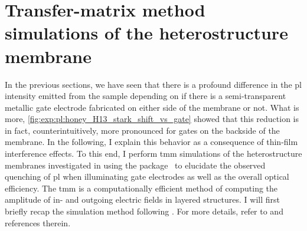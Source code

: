 \section{Transfer-matrix method simulations of the heterostructure membrane}\label{sec:exp:tmm}
In the previous sections, we have seen that there is a profound difference in the \gls{pl} intensity emitted from the sample depending on if there is a semi-transparent metallic gate electrode fabricated on either side of the membrane or not.
What is more, \cref{fig:exp:pl:honey_H13_stark_shift_vs_gate} showed that this reduction is in fact, counterintuitively, more pronounced for gates on the backside of the membrane.
In the following, I explain this behavior as a consequence of thin-film interference effects.
To this end, I perform \gls{tmm} simulations of the heterostructure membranes investigated in \thispart using the \pymoosh package~\cite{Langevin2024} to elucidate the observed quenching of \gls{pl} when illuminating gate electrodes as well as the overall optical efficiency.
The \gls{tmm} is a computationally efficient method of computing the amplitude of in- and outgoing electric fields in layered structures.
I will first briefly recap the simulation method following .
For more details, refer to \ibid and references therein.

